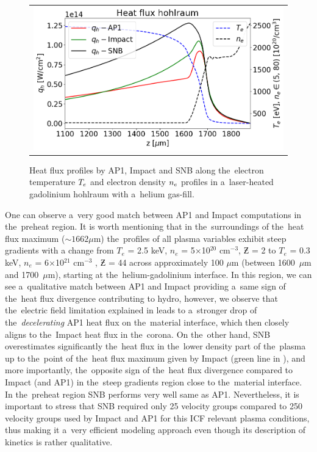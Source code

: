\begin{figure}[htb]
  \begin{center}
    \begin{tabular}{c}
      \includegraphics[width=\figscale\textwidth]{../VFPdata/C7_GdHohlraum_heatflux.png}
    \end{tabular}
  \caption{
  Heat flux profiles by AP1, Impact and SNB along 
  the~electron temperature $T_e$ and electron density $n_e$
  profiles in a~laser-heated gadolinium hohlraum 
  with a~helium gas-fill.
  }
  \label{fig:Gd_VFP_10ps_heatflux}
  \end{center} 
\end{figure}

One can observe a~very good
match between AP1 and Impact computations in the~preheat region.
It is worth mentioning that in the~surroundings of the~heat flux maximum 
($\sim 1662 \mu$m) the~profiles of all plasma variables exhibit steep gradients 
with a change from $T_e$ = 2.5 keV, $n_e$ = 5$\times$10$^{20}$ cm$^{−3}$, 
$\Zbar$ = 2 to $T_e$ = 0.3 keV, $n_e$ = 6$\times$10$^{21}$ cm$^{−3}$ , 
$\Zbar$ = 44 across approximately 100 $\mu$m 
(between 1600~$\mu$m and 1700~$\mu$m), starting at the~helium-gadolinium 
interface.  
In this region, we can see a~qualitative match between AP1 and Impact providing
a~same sign of the~heat flux divergence contributing to hydro, however,
we observe that the~electric field limitation explained in 
 leads to a~stronger drop of 
the~\textit{decelerating} AP1 heat flux on the~material 
interface, which then closely aligns to the~Impact heat flux in the~corona. 
On the~other hand, 
SNB overestimates significantly the~heat flux in the~lower density part 
of the~plasma up to the~point of the~heat flux maximum given by Impact 
(green line in ), and more 
importantly, the~opposite sign of the~heat flux divergence compared to Impact
(and AP1) in the~steep gradients region close to the~material interface. 
In the~preheat region SNB performs 
very well same as AP1. Nevertheless, it is important to stress that 
SNB required only 25 velocity groups compared to 250 velocity groups used by
Impact and AP1 for this ICF relevant plasma conditions, thus making it a~very
efficient modeling approach even though its description of kinetics is rather
qualitative.

%
